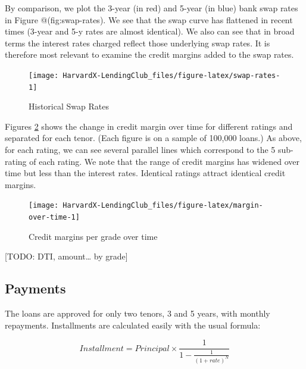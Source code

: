 \documentclass[11pt,]{report}
\begin{document}
\normalsize

By comparison, we plot the 3-year (in red) and 5-year (in blue) bank swap rates in Figure @(fig:swap-rates). We see that the swap curve has flattened in recent times (3-year and 5-y rates are almost identical). We also can see that in broad terms the interest rates charged reflect those underlying swap rates. It is therefore most relevant to examine the credit margins added to the swap rates.

\small

\begin{figure}

{\centering \texttt{[image: HarvardX-LendingClub\_files/figure-latex/swap-rates-1]} 

}

\caption{Historical Swap Rates}\label{fig:swap-rates}
\end{figure}

\normalsize

Figures \ref{fig:margin-over-time} shows the change in credit margin over time for different ratings and separated for each tenor. (Each figure is on a sample of 100,000 loans.) As above, for each rating, we can see several parallel lines which correspond to the 5 sub-rating of each rating. We note that the range of credit margins has widened over time but less than the interest rates. Identical ratings attract identical credit margins.

\small

\begin{figure}

{\centering \texttt{[image: HarvardX-LendingClub\_files/figure-latex/margin-over-time-1]} 

}

\caption{Credit margins per grade over time}\label{fig:margin-over-time}
\end{figure}

\normalsize

{[}TODO: DTI, amount\ldots{} by grade{]}

\hypertarget{payments}{%
\subsection{Payments}\label{payments}}

The loans are approved for only two tenors, 3 and 5 years, with monthly repayments. Installments are calculated easily with the usual formula:

\[
Installment = Principal \times \frac{1}{1 - \frac{1}{(1+rate)^N}}
\]
\end{document}
